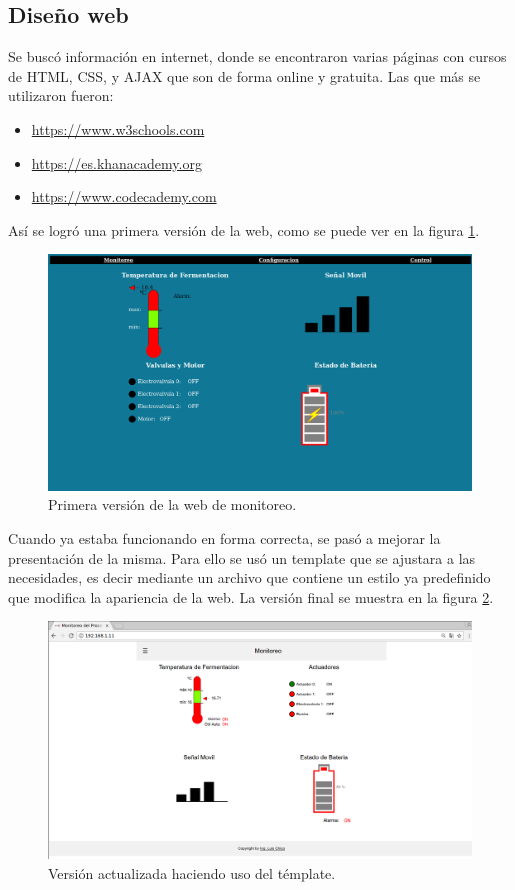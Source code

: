 \subsection*{Diseño web}
Se buscó información en internet, donde se encontraron varias páginas con cursos de HTML, CSS, y AJAX que son de forma online y gratuita. Las que más se utilizaron fueron:
\begin{itemize}
  \item \url{https://www.w3schools.com}
  \item \url{https://es.khanacademy.org}
  \item \url{https://www.codecademy.com}
\end{itemize}
Así se logró una primera versión de la web, como se puede ver en la figura \ref{fig:old_web}.
\begin{figure}[!htb]
  \centering
  \includegraphics[scale=.25]{./Figures/old_web.png}
  \caption{Primera versión de la web de monitoreo.}
  \label{fig:old_web}
\end{figure}

Cuando ya estaba funcionando en forma correcta, se pasó a mejorar la presentación de la misma. Para ello se usó un template que se ajustara a las necesidades, es decir mediante un archivo que contiene un estilo ya predefinido que modifica la apariencia de la web. La versión final se muestra en la figura \ref{fig:web_template}.

\begin{figure}[!h]
  \centering
  \includegraphics[scale=.25]{./Figures/web_monitoreo.png}
  \caption{Versión actualizada haciendo uso del témplate.}
  \label{fig:web_template}
\end{figure}

